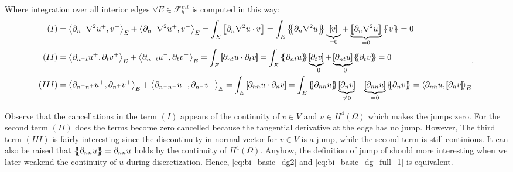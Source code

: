 Where integration over all interior edges $ \forall E \in \mathcal{F}_{h}^{int}$ is computed in this way:
\begin{equation*}
    \begin{split}
        (I) &  =    \left<\partial _{n^{+}} \nabla ^2 u^{+} ,v^{+}\right>_{E} +
        \left<\partial _{n^{-}} \nabla ^2 u^{+} ,v^{-}\right>_{E} =   \int_{E}^{}
        \jump{ \partial _{n} \nabla ^2 u \cdot v } =
         \int_{E}^{}
         \mean{ \partial _{n} \nabla ^2 u } \underbrace{\jump{ v }}_{= 0}    + \underbrace{\jump{ \partial _{n} \nabla ^2 u
         }}_{= 0}    \mean{ v } = 0 \\
        (II) &  =     \left<\partial _{n^{+}t} u^{+}, \partial_{t} v^{+}
        \right>_{E} +  \left<\partial _{n^{-}t} u^{-}, \partial_{t} v^{-}
\right>_{E}    =   \int_{E}^{}
        \jump{ \partial _{nt} u \cdot  \partial_{t} v } =
         \int_{E}^{}
         \mean{ \partial _{nt} u    } \underbrace{\jump{ \partial_{t} v }  }_{= 0}    + \underbrace{\jump{ \partial
                 _{nt}  u
         }}_{= 0}    \mean{ \partial _{t}v }  = 0\\
        (III) &  =     \left<\partial _{n^{+}n^{+}} u^{+}, \partial_{n^{+}} v^{+} \right>_{E} +  \left<\partial _{n^{-}n^{-}} u^{-}, \partial_{n^{-}} v^{-} \right>_{E}    =    \int_{E}^{} \jump{ \partial _{nn} u \cdot  \partial_{n} v } = \int_{E}^{}
        \mean{ \partial _{nn} u    } \underbrace{\jump{ \partial_{n} v }  }_{\neq 0}    + \underbrace{\jump{ \partial
                 _{nn}  u
         }}_{= 0}    \mean{ \partial _{n}v } =
        \left< \partial _{nn} u    , \jump{ \partial_{n} v } \right>_{E}  \\
    \end{split}
.\end{equation*}

Observe that the cancellations in the term $(I)$ appears of the continuity of $v\in V $ and $u\in H^{4}\left( \Omega  \right) $ which makes the jumps zero. For the second term $(II)$ does the terms become zero cancelled because the tangential derivative at the edge
has no jump. However, The third term $(III)$  is fairly interesting since the discontinuity in normal vector for $v \in V$ is a jump, while the second term is still continious. It can also be raised that $\left\{\!\!\left\{ \partial _{nn} u \right\}\!\!\right\} = \partial _{nn} u  $ holds by the continuity of $H^{4}\left( \Omega  \right) $. Anyhow, the definition of jump of should more interesting when we later weakend the continuity of $u$ during discretization.
Hence, \eqref{eq:bi_basic_dg2} and \eqref{eq:bi_basic_dg_full_1} is equivalent.

